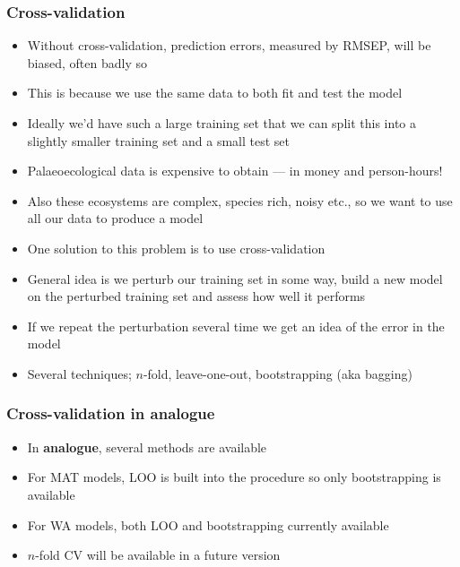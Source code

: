\documentclass{beamer}
\begin{document}
\begin{frame}
    \frametitle{Cross-validation}
    \begin{itemize}
        \item Without cross-validation, prediction errors, measured by RMSEP, will be biased, often badly so
        \item This is because we use the same data to both fit \alert{and} test the model
        \item Ideally we'd have such a large training set that we can split this into a slightly smaller training set and a small test set
        \item Palaeoecological data is expensive to obtain --- in money and person-hours!
        \item Also these ecosystems are complex, species rich, noisy etc., so we want to use all our data to produce a model
        \item One solution to this problem is to use cross-validation
        \item General idea is we perturb our training set in some way, build a new model on the perturbed training set and assess how well it performs
        \item If we repeat the perturbation several time we get an idea of the error in the model
        \item Several techniques; $n$-fold, leave-one-out, bootstrapping (aka \alert{bagging})
    \end{itemize}
\end{frame}

\begin{frame}
    \frametitle{Cross-validation in \textbf{analogue}}
    \begin{itemize}
        \item In \textbf{analogue}, several methods are available
        \item For MAT models, LOO is built into the procedure so only bootstrapping is available
        \item For WA models, both LOO and bootstrapping currently available
        \item $n$-fold CV will be available in a future version
    \end{itemize}
\end{frame}
\end{document}
